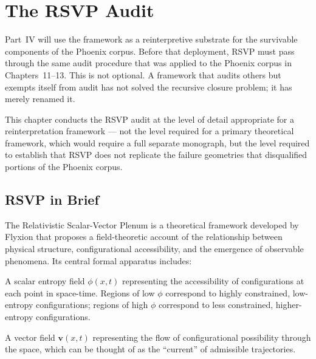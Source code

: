 
\chapter{The RSVP Audit}
\label{ch:rsvp-audit}


\noindent
Part~IV will use the \RSVPfull{} framework as a
reinterpretive substrate for the survivable components
of the Phoenix corpus. Before that deployment, RSVP
must pass through the same audit procedure that was
applied to the Phoenix corpus in Chapters~11--13.
This is not optional. A framework that audits others
but exempts itself from audit has not solved the
recursive closure problem; it has merely renamed it.

This chapter conducts the RSVP audit at the level of
detail appropriate for a reinterpretation framework
--- not the level required for a primary theoretical
framework, which would require a full separate monograph,
but the level required to establish that RSVP does
not replicate the failure geometries that disqualified
portions of the Phoenix corpus.

\section{RSVP in Brief}
\label{sec:rsvp-brief}

The Relativistic Scalar-Vector Plenum is a theoretical
framework developed by Flyxion that proposes a
field-theoretic account of the relationship between
physical structure, configurational accessibility,
and the emergence of observable phenomena. Its central
formal apparatus includes:

A scalar entropy field $\phi(x,t)$ representing the
accessibility of configurations at each point in
space-time. Regions of low $\phi$ correspond to
highly constrained, low-entropy configurations; regions
of high $\phi$ correspond to less constrained, higher-entropy
configurations.

A vector field $\mathbf{v}(x,t)$ representing the
flow of configurational possibility through the space,
which can be thought of as the ``current'' of admissible
trajectories.

